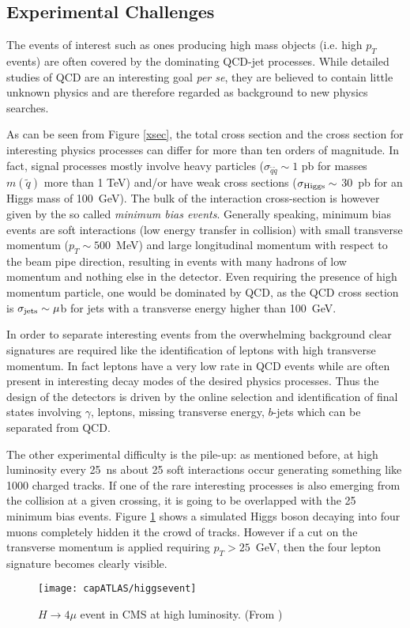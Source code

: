 \subsection{Experimental Challenges}\label{sec:LHCprobl}

The events of interest such as ones producing high mass objects (i.e. high $p_{T}$ events) are often covered by the dominating QCD-jet processes. While detailed studies of QCD are an interesting goal \textit{per se}, they are believed to contain little unknown physics and are therefore regarded as background to new physics searches.

As can be seen from Figure \ref{xsec}, the total cross section and the cross section for interesting physics processes can differ for more than ten orders of magnitude. In fact, signal processes mostly involve heavy particles ($\sigma_{\tilde{q}\tilde{q}} \sim 1$ pb for masses $m(\tilde{q})$ more than 1 TeV) and/or have weak cross sections ($\sigma_{\mbox{\scriptsize Higgs}} \sim $ 30~pb for an Higgs mass of 100~GeV).
The bulk of the interaction cross-section is however given by
the so called \textit{minimum bias events}. Generally speaking, minimum bias events are soft interactions (low energy transfer in collision) with small transverse momentum ($p_{T} \sim 500$~MeV) and large longitudinal momentum with respect to the beam pipe direction, resulting in events with many hadrons of low momentum and nothing else in the detector.
Even requiring the presence of high momentum particle, one would be dominated by QCD,  as the QCD cross section is $\sigma_{\mbox{\scriptsize jets}} \sim \mu$b for jets with a transverse energy higher than 100~GeV. 

In order to separate interesting events from the overwhelming background clear signatures are required like the identification of leptons with high transverse momentum. In fact leptons have a very low rate in QCD events while are often present in interesting decay modes of the desired physics processes. Thus the design of the detectors is  driven by the online selection and identification of final states involving $\gamma$, leptons, missing transverse energy, $b$-jets which can be separated from QCD.

The other experimental difficulty is the pile-up: as mentioned before, at high luminosity every 25~ns about 25 soft interactions occur generating something like 1000 charged tracks. If one of the rare interesting processes is also emerging from the collision at a given crossing, it is going to be overlapped with the 25 minimum bias events. Figure \ref{higgsevent} shows a simulated Higgs boson decaying into four muons completely hidden it the crowd of tracks. However if a cut on the transverse momentum is applied requiring $p_{T}>25$~GeV, then the four lepton signature becomes clearly visible. \begin{figure}[htb]\begin{center}
\texttt{[image: capATLAS/higgsevent]}\caption{$H\rightarrow 4\mu$ event in CMS at high luminosity. (From \cite{slideGiacomo})}\label{higgsevent}
\end{center}\end{figure}

